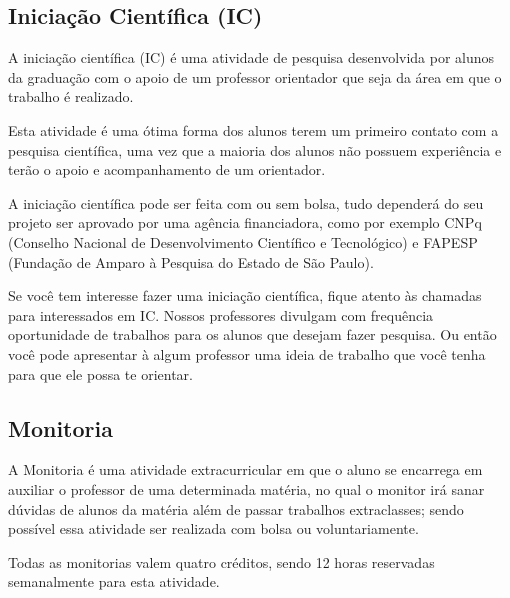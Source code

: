 \subsection{Iniciação Científica (IC)}
A iniciação científica (IC) é uma atividade de pesquisa desenvolvida por alunos da graduação com o apoio de um professor orientador que seja da área em que o trabalho é realizado.

Esta atividade é uma ótima forma dos alunos terem um primeiro contato com a pesquisa científica, uma vez que a maioria dos alunos não possuem experiência e terão o apoio e acompanhamento de um orientador.

A iniciação científica pode ser feita com ou sem bolsa, tudo dependerá do seu projeto ser aprovado por uma agência financiadora,  como por exemplo CNPq (Conselho Nacional de Desenvolvimento Científico e Tecnológico) e FAPESP (Fundação de Amparo à Pesquisa do Estado de São Paulo). 

Se você tem interesse fazer uma iniciação científica, fique atento às chamadas para interessados em IC. Nossos professores divulgam com frequência oportunidade de trabalhos para os alunos que desejam fazer pesquisa. Ou então você pode apresentar à algum professor uma ideia de trabalho que você tenha para que ele possa te orientar.

\subsection{Monitoria}
A Monitoria é uma atividade extracurricular em que o aluno se encarrega em auxiliar o professor de uma determinada matéria, no qual o monitor irá sanar dúvidas de alunos da matéria além de passar trabalhos extraclasses; sendo possível essa atividade ser realizada com bolsa ou voluntariamente.

Todas as monitorias valem quatro créditos, sendo 12 horas reservadas semanalmente para esta atividade.
